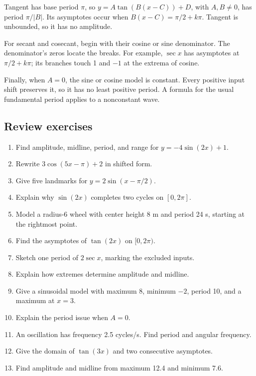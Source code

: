 Tangent has base period \(\pi\), so \(y=A\tan(B(x-C))+D\), with \(A,B\ne0\), has period \(\pi/|B|\). Its asymptotes occur when \(B(x-C)=\pi/2+k\pi\). Tangent is unbounded, so it has no amplitude.

For secant and cosecant, begin with their cosine or sine denominator. The denominator's zeros locate the breaks. For example, \(\sec x\) has asymptotes at \(\pi/2+k\pi\); its branches touch 1 and \(-1\) at the extrema of cosine.

Finally, when \(A=0\), the sine or cosine model is constant. Every positive input shift preserves it, so it has no least positive period. A formula for the usual fundamental period applies to a nonconstant wave.

\hypertarget{m3-review-exercises}{%
\subsection{Review exercises}\label{m3-review-exercises}}

\begin{enumerate}
\def\labelenumi{\arabic{enumi}.}
\tightlist
\item
  Find amplitude, midline, period, and range for \(y=-4\sin(2x)+1\).
\item
  Rewrite \(3\cos(5x-\pi)+2\) in shifted form.
\item
  Give five landmarks for \(y=2\sin(x-\pi/2)\).
\item
  Explain why \(\sin(2x)\) completes two cycles on \([0,2\pi]\).
\item
  Model a radius-6 wheel with center height 8 m and period 24 s, starting at the rightmost point.
\item
  Find the asymptotes of \(\tan(2x)\) on \([0,2\pi)\).
\item
  Sketch one period of \(2\sec x\), marking the excluded inputs.
\item
  Explain how extremes determine amplitude and midline.
\item
  Give a sinusoidal model with maximum 8, minimum \(-2\), period 10, and a maximum at \(x=3\).
\item
  Explain the period issue when \(A=0\).
\item
  An oscillation has frequency 2.5 cycles/s. Find period and angular frequency.
\item
  Give the domain of \(\tan(3x)\) and two consecutive asymptotes.
\item
  Find amplitude and midline from maximum 12.4 and minimum 7.6.
\end{enumerate}

